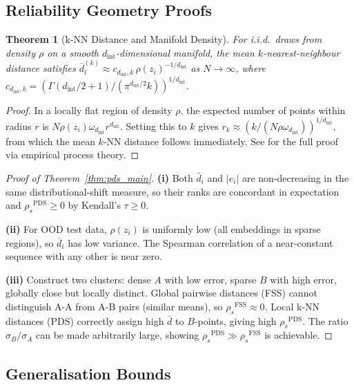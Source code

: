 \documentclass[10pt]{article}
\newtheorem{theorem}{Theorem}[section]
\theoremstyle{definition}
\theoremstyle{remark}
\newcommand{\pds}{\ensuremath{\mathrm{PDS}}}
\newcommand{\fss}{\ensuremath{\mathrm{FSS}}}
\newcommand{\rspear}{\ensuremath{\rho_s}}
\newcommand{\dint}{\ensuremath{d_{\mathrm{int}}}}
\begin{document}
\subsection{Reliability Geometry Proofs}
\label{app:reliability_proofs}

\begin{theorem}[k-NN Distance and Manifold Density]
\label{thm:knn_density_app}
For i.i.d.\ draws from density $\rho$ on a smooth $\dint$-dimensional
manifold, the mean $k$-nearest-neighbour distance satisfies
$\bar{d}_i^{(k)} \approx c_{\dint,k}\,\rho(z_i)^{-1/\dint}$
as $N\to\infty$, where
$c_{\dint,k} = (\Gamma(\dint/2+1)/(\pi^{\dint/2}k))^{1/\dint}$.
\end{theorem}
\begin{proof}
In a locally flat region of density $\rho$, the expected number of points
within radius $r$ is $N\rho(z_i)\omega_{\dint}r^{\dint}$.
Setting this to $k$ gives
$r_k \approx (k/(N\rho\omega_{\dint}))^{1/\dint}$, from which the mean
$k$-NN distance follows immediately.
See \citet{penrose2003random} for the full proof via empirical process theory.
\end{proof}

\begin{proof}[Proof of Theorem~\ref{thm:pds_main}]
\textbf{(i)} Both $\bar{d}_i$ and $|e_i|$ are non-decreasing in the same
distributional-shift measure, so their ranks are concordant in expectation
and $\rspear^{\pds} \geq 0$ by Kendall's $\tau \geq 0$.

\textbf{(ii)} For OOD test data, $\rho(z_i)$ is uniformly low (all embeddings
in sparse regions), so $\bar{d}_i$ has low variance. The Spearman correlation
of a near-constant sequence with any other is near zero.

\textbf{(iii)} Construct two clusters: dense $A$ with low error, sparse $B$
with high error, globally close but locally distinct.
Global pairwise distances (FSS) cannot distinguish A-A from A-B pairs
(similar means), so $\rspear^{\fss} \approx 0$.
Local k-NN distances (PDS) correctly assign high $\bar{d}$ to $B$-points,
giving high $\rspear^{\pds}$.
The ratio $\sigma_B/\sigma_A$ can be made arbitrarily large, showing
$\rspear^{\pds} \gg \rspear^{\fss}$ is achievable.
\end{proof}

\subsection{Generalisation Bounds}
\label{app:gen_proofs}
\end{document}
